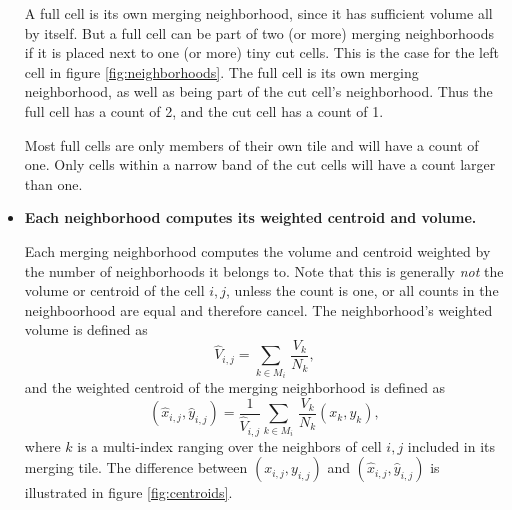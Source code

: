 \begin{itemize}
\vspace*{.1in}
A full cell is its own merging neighborhood, since it has sufficient
volume all by itself.
But a full cell can be part of 
two (or more)  merging neighborhoods  if it is placed next to 
one (or more)  tiny cut cells. This is the case for the left cell in figure
\ref{fig:neighborhoods}. The full cell is its own merging neighborhood, 
as well as being part of the cut cell's neighborhood. Thus the full cell has a
count of 2, and the cut cell has a count of 1.

Most full
cells are only members of their own tile and will have a count of one.
Only cells within a narrow band of the cut cells will have a count
larger than one.

\item
{\bf Each neighborhood computes its weighted centroid and volume.}

Each merging neighborhood computes the  volume and centroid weighted by
the number of neighborhoods it belongs to.  Note that this is generally
\textit{not} the volume or centroid of the cell $i,j$, unless the count is one, or
all counts in the neighboorhood are equal and therefore cancel.  
The neighborhood's weighted volume is defined as
\begin{equation}
\label{voldef}
{\widehat V}_{i,j} =  \sum_{k \in M_i } \,  \frac{V_k}{N_k},
\end{equation}
and the weighted centroid of the merging neighborhood is defined as
\begin{equation}
\label{centroiddef}
({\widehat x}_{i,j},{\widehat y}_{i,j}) = \frac{1}{\widehat V_{i,j}} \sum_{k \in M_i } \,  \frac{V_k}{N_k}(x_k,y_k),
\end{equation}
where $k$ is a multi-index ranging over the neighbors of cell $i,j$ included in its merging tile.  The difference between $(x_{i,j}, y_{i,j})$ and $(\widehat{x}_{i,j}, \widehat{y}_{i,j})$ is illustrated in figure \ref{fig:centroids}.


\end{itemize}
